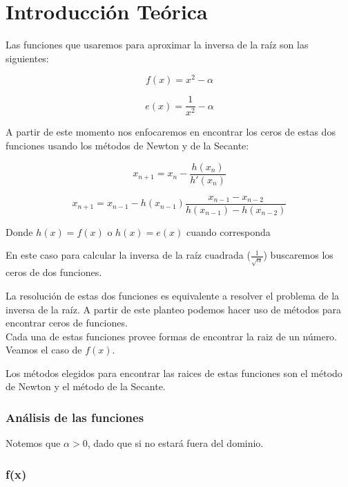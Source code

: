 \section{Introducción Teórica}

Las funciones que usaremos para aproximar la inversa de la raíz son las siguientes:

\begin{displaymath}
    f(x) = x^2 - \alpha
\end{displaymath}

\begin{displaymath}
    e(x) = \frac{1}{x^2} - \alpha
\end{displaymath}

A partir de este momento nos enfocaremos en encontrar los ceros de estas dos funciones usando los métodos de Newton y de la Secante:

\begin{displaymath}
    x_{n + 1} = x_n - \frac{h(x_n)}{h'(x_n)}
\end{displaymath}

\begin{displaymath}
    x_{n + 1} = x_{n - 1} - h(x_{n - 1})\frac{x_{n - 1} - x_{n - 2}}{h(x_{n - 1}) - h(x_{n - 2})}
\end{displaymath}

Donde $\displaystyle h(x) = f(x)$ o $\displaystyle h(x) = e(x)$ cuando corresponda

En este caso para calcular la inversa de la raíz cuadrada
($\displaystyle\frac{1}{\sqrt{\alpha}}$) buscaremos los ceros de dos funciones.

La resolución de estas dos funciones es equivalente a resolver el problema de la
inversa de la raíz. A partir de este planteo
podemos hacer uso de métodos para encontrar ceros de funciones.\\

Cada una de estas funciones provee formas de encontrar la raiz de un número.
Veamos el caso de $f(x)$.

Los métodos elegidos para encontrar las raices de estas funciones son el método
de Newton y el método de la Secante.

\subsubsection{Análisis de las funciones}

Notemos que $\alpha > 0$, dado que si no estará fuera del dominio.

\subsubsection{f(x)}


